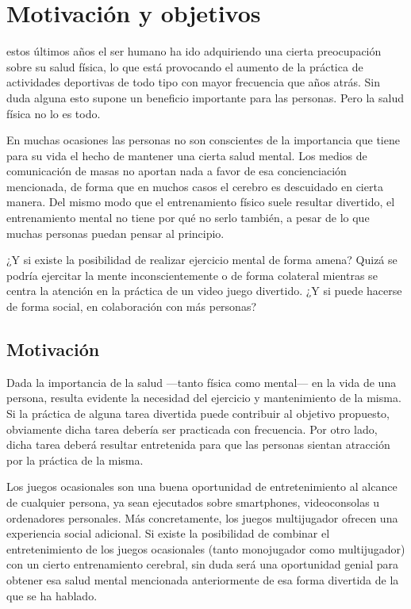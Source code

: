 \chapter{Motivación y objetivos}
\label{chap:objetivos}

 estos últimos años el ser humano ha ido adquiriendo una cierta preocupación sobre su salud física, lo que está provocando el aumento de la práctica de actividades deportivas de todo tipo con mayor frecuencia que años atrás. Sin duda alguna esto supone un beneficio importante para las personas. Pero la salud física no lo es todo.

En muchas ocasiones las personas no son conscientes de la importancia que tiene para su vida el hecho de mantener una cierta salud mental. Los medios de comunicación de masas no aportan nada a favor de esa concienciación mencionada, de forma que en muchos casos el cerebro es descuidado en cierta manera. Del mismo modo que el entrenamiento físico suele resultar divertido, el entrenamiento mental no tiene por qué no serlo también, a pesar de lo que muchas personas puedan pensar al principio.

¿Y si existe la posibilidad de realizar ejercicio mental de forma amena? Quizá se podría ejercitar la mente inconscientemente o de forma colateral mientras se centra la atención en la práctica de un video juego divertido. ¿Y si puede hacerse de forma social, en colaboración con más personas?

\section{Motivación}

Dada la importancia de la salud ---tanto física como mental--- en la vida de una persona, resulta evidente la necesidad del ejercicio y mantenimiento de la misma. Si la práctica de alguna tarea divertida puede contribuir al objetivo propuesto, obviamente dicha tarea debería ser practicada con frecuencia. Por otro lado, dicha tarea deberá resultar entretenida para que las personas sientan atracción por la práctica de la misma.

Los juegos ocasionales son una buena oportunidad de entretenimiento al alcance de cualquier persona, ya sean ejecutados sobre smartphones, videoconsolas u ordenadores personales. Más concretamente, los juegos multijugador ofrecen una experiencia social adicional. Si existe la posibilidad de combinar el entretenimiento de los juegos ocasionales (tanto monojugador como multijugador) con un cierto entrenamiento cerebral, sin duda será una oportunidad genial para obtener esa salud mental mencionada anteriormente de esa forma divertida de la que se ha hablado.

